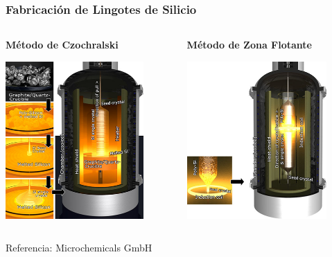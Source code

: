 \documentclass[10pt,t,aspectratio=169]{beamer}
\begin{document}
\begin{frame}[t]
  \frametitle{Fabricación de Lingotes de Silicio}
  \begin{columns}
    \begin{column}[t]{0.5\textwidth}
      \centering
      \textbf{Método de Czochralski}

      \vspace{2mm}
      \includegraphics[height=6cm]{./figures/czochralski.png}
    \end{column}
    \begin{column}[t]{0.5\textwidth}
      \centering
      \textbf{Método de Zona Flotante}

      \vspace{2mm}
      \includegraphics[height=6cm]{./figures/floatingzone.png}
    \end{column}
  \end{columns}

  \vspace{2mm}
  \centering
  \small{Referencia: Microchemicals GmbH}
\end{frame}
\end{document}
